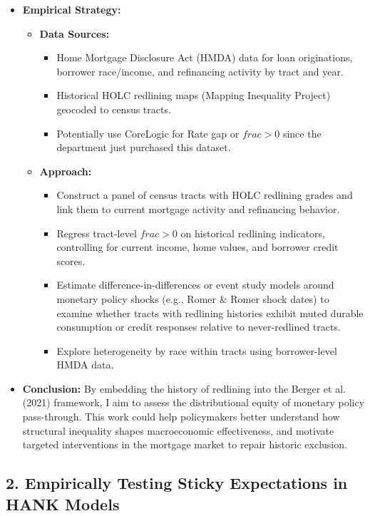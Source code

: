 \documentclass[10pt]{article}
\begin{document}
\begin{itemize}
\item \textbf{Empirical Strategy:}
\begin{itemize}
    \item \textbf{Data Sources:}
    \begin{itemize}
        \item Home Mortgage Disclosure Act (HMDA) data for loan originations, borrower race/income, and refinancing activity by tract and year.
        \item Historical HOLC redlining maps (Mapping Inequality Project) geocoded to census tracts.
        \item Potentially use CoreLogic for Rate gap or $frac > 0$ since the department just purchased this dataset.
    \end{itemize}
    \item \textbf{Approach:}
    \begin{itemize}
        \item Construct a panel of census tracts with HOLC redlining grades and link them to current mortgage activity and refinancing behavior.
        \item Regress tract-level $frac > 0$ on historical redlining indicators, controlling for current income, home values, and borrower credit scores.
        \item Estimate difference-in-differences or event study models around monetary policy shocks (e.g., Romer \& Romer shock dates) to examine whether tracts with redlining histories exhibit muted durable consumption or credit responses relative to never-redlined tracts.
        \item Explore heterogeneity by race within tracts using borrower-level HMDA data.
    \end{itemize}
\end{itemize}
\item \textbf{Conclusion:}
By embedding the history of redlining into the Berger et al. (2021) framework, I aim to assess the distributional equity of monetary policy pass-through. This work could help policymakers better understand how structural inequality shapes macroeconomic effectiveness, and motivate targeted interventions in the mortgage market to repair historic exclusion.
\end{itemize}





\subsection*{2. Empirically Testing Sticky Expectations in HANK Models}
\end{document}
